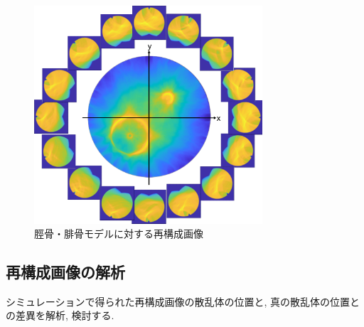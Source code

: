 \begin{figure}[H]
  \begin{center}
    \includegraphics[width=85mm]{fig/hikotsu16.pdf}
  \end{center}
  \caption{脛骨・腓骨モデルに対する再構成画像}
\end{figure}
\subsection{再構成画像の解析}
シミュレーションで得られた再構成画像の散乱体の位置と, 真の散乱体の位置との差異を解析, 検討する. 

